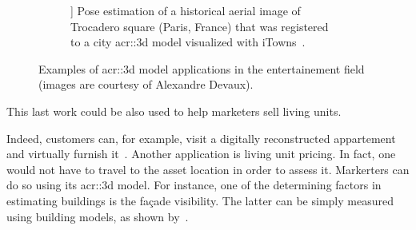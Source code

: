\begin{figure}[htpb]
\begin{subfigure}{.48\textwidth}
\begin{center}
                        ]{
                            \label{subfig::historical_pose} Pose estimation of a historical aerial image of Trocadero square (Paris, France) that was registered~\parencite{harrach2019interactive} to a city \gls{acr::3d} model visualized with iTowns\footnotemark~\parencite{devaux2012web}.
                        }
                    \end{center}
                \end{subfigure}
                \caption[
                    Examples of \gls{acr::3d} model applications in the entertainement field (images are courtesy of Alexandre Devaux)
                ]{
                    \label{fig::entertainement} Examples of \gls{acr::3d} model applications in the entertainement field (images are courtesy of Alexandre Devaux\footnotemark).
                }
            \end{figure}
            This last work could be also used to help marketers sell living units.
            \addtocounter{footnote}{-1}
            \addtocounter{footnote}{1}
            Indeed, customers can, for example, visit a digitally reconstructed appartement and virtually furnish it~\parencite{kim2019planar}.
            Another application is living unit pricing.
            In fact, one would not have to travel to the asset location in order to assess it.
            Markerters can do so using its \gls{acr::3d} model.
            For instance, one of the determining factors in estimating buildings is the fa\c{c}ade visibility.
            The latter can be simply measured using building models, as shown by~\textcite{albrecht2013assessing}.


